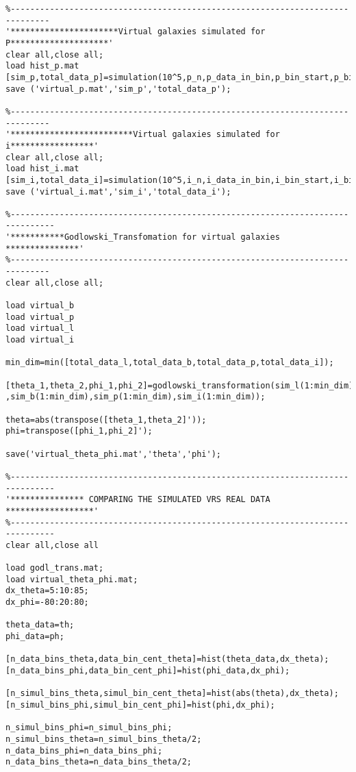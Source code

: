 \begin{verbatim}
%------------------------------------------------------------------------------
'**********************Virtual galaxies simulated for P********************'
clear all,close all;
load hist_p.mat
[sim_p,total_data_p]=simulation(10^5,p_n,p_data_in_bin,p_bin_start,p_binsize);
save ('virtual_p.mat','sim_p','total_data_p');

%------------------------------------------------------------------------------
'*************************Virtual galaxies simulated for i*****************'
clear all,close all;
load hist_i.mat
[sim_i,total_data_i]=simulation(10^5,i_n,i_data_in_bin,i_bin_start,i_binsize);
save ('virtual_i.mat','sim_i','total_data_i');

%-------------------------------------------------------------------------------
'***********Godlowski_Transfomation for virtual galaxies ***************'
%------------------------------------------------------------------------------
clear all,close all;

load virtual_b
load virtual_p
load virtual_l
load virtual_i

min_dim=min([total_data_l,total_data_b,total_data_p,total_data_i]);

[theta_1,theta_2,phi_1,phi_2]=godlowski_transformation(sim_l(1:min_dim)...
,sim_b(1:min_dim),sim_p(1:min_dim),sim_i(1:min_dim));

theta=abs(transpose([theta_1,theta_2]'));
phi=transpose([phi_1,phi_2]');

save('virtual_theta_phi.mat','theta','phi');

%-------------------------------------------------------------------------------
'*************** COMPARING THE SIMULATED VRS REAL DATA ******************'
%-------------------------------------------------------------------------------
clear all,close all

load godl_trans.mat;
load virtual_theta_phi.mat;
dx_theta=5:10:85;
dx_phi=-80:20:80;

theta_data=th;
phi_data=ph;

[n_data_bins_theta,data_bin_cent_theta]=hist(theta_data,dx_theta);
[n_data_bins_phi,data_bin_cent_phi]=hist(phi_data,dx_phi);

[n_simul_bins_theta,simul_bin_cent_theta]=hist(abs(theta),dx_theta);
[n_simul_bins_phi,simul_bin_cent_phi]=hist(phi,dx_phi);

n_simul_bins_phi=n_simul_bins_phi;
n_simul_bins_theta=n_simul_bins_theta/2;
n_data_bins_phi=n_data_bins_phi;
n_data_bins_theta=n_data_bins_theta/2;


\end{verbatim}
